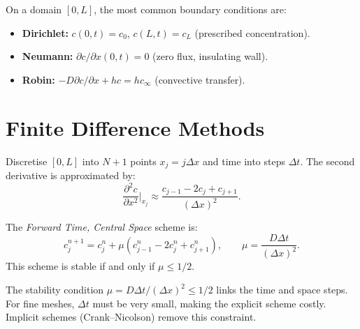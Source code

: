 \begin{definition}
On a domain $[0,L]$, the most common boundary conditions are:
\begin{itemize}
  \item \textbf{Dirichlet:} $c(0,t)=c_0$, $c(L,t)=c_L$ (prescribed
    concentration).
  \item \textbf{Neumann:} $\partial c/\partial x(0,t)=0$ (zero flux,
    insulating wall).
  \item \textbf{Robin:} $-D\partial c/\partial x + hc = hc_\infty$
    (convective transfer).
\end{itemize}
\end{definition}

\section{Finite Difference Methods}
\label{sec:finite_diff}

\begin{definition}[Discretisation]
Discretise $[0,L]$ into $N+1$ points $x_j=j\Delta x$ and time into
steps $\Delta t$.  The second derivative is approximated by:
\[
  \frac{\partial^2 c}{\partial x^2}\bigg|_{x_j}
  \approx \frac{c_{j-1}-2c_j+c_{j+1}}{(\Delta x)^2}.
\]
\end{definition}

\begin{theorem}
The \textit{Forward Time, Central Space} scheme is:
\[
  c_j^{n+1} = c_j^n + \mu(c_{j-1}^n - 2c_j^n + c_{j+1}^n),
  \qquad \mu = \frac{D\Delta t}{(\Delta x)^2}.
\]
This scheme is stable if and only if $\mu\leq 1/2$.
\end{theorem}

\begin{warning}[title=\textbf{CFL condition}]
The stability condition $\mu = D\Delta t/(\Delta x)^2 \leq 1/2$
links the time and space steps.  For fine meshes, $\Delta t$ must
be very small, making the explicit scheme costly.  Implicit schemes
(Crank--Nicolson) remove this constraint.
\end{warning}

